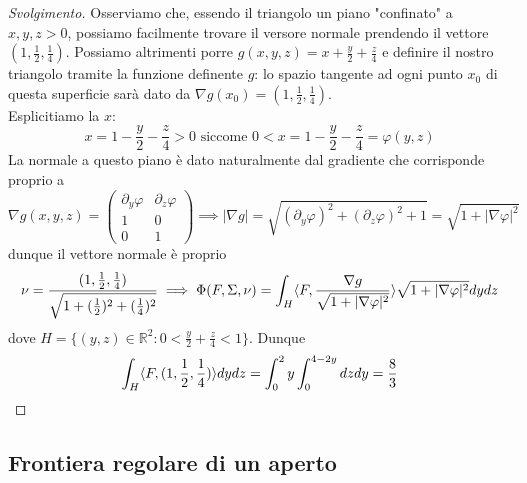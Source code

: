 \begin{proof}[Svolgimento]
	Osserviamo che, essendo il triangolo un piano "confinato" a $x, y, z > 0$, possiamo facilmente trovare il versore normale prendendo il vettore $(1, \frac{1}{2}, \frac{1}{4})$. Possiamo altrimenti porre
	$g(x, y, z) = x + \frac{y}{2} + \frac{z}{4}$ e definire il nostro triangolo tramite la funzione definente $g$: lo spazio tangente ad ogni punto $x_0$ di questa superficie sarà dato da $\nabla g(x_0) = (1, \frac{1}{2},\frac{1}{4})$. \\
	Esplicitiamo la $x$:
	$$
	x = 1 - \frac{y}{2} - \frac{z}{4} > 0 \text{ siccome } 0 < x = 1 - \frac{y}{2} - \frac{z}{4} = \varphi(y, z)
	$$
	La normale a questo piano è dato naturalmente dal gradiente che corrisponde proprio a
	$$
	\nabla g(x, y, z) = \begin{pmatrix} 
		\partial_y \varphi & \partial_z \varphi \\
		1 & 0 \\
		0 & 1
	\end{pmatrix} \implies |\nabla g| = \sqrt{(\partial_y \varphi)^2 + (\partial_z \varphi)^2 + 1} = \sqrt{1 + |\nabla \varphi|^2} 
	$$
	dunque il vettore normale è proprio
	$$
	\nu = \frac{(1, \frac{1}{2}, \frac{1}{4})}{\sqrt{1 + (\frac{1}{2})^2 + (\frac{1}{4})^2}} \implies \Phi(F, \Sigma, \nu) = \int_H \langle F, \frac{\nabla g}{\sqrt{1 + |\nabla \varphi|^2}} \rangle \sqrt{1 + |\nabla \varphi|^2} dydz
	$$
	dove $H = \{(y, z) \in \mathbb{R}^2 : 0 < \frac{y}{2} + \frac{z}{4} < 1 \}$. Dunque
	$$
	\int_H \langle F, (1, \frac{1}{2}, \frac{1}{4}) \rangle dydz =	\int_0^2 y \int_0^{4 - 2y} dzdy = \frac{8}{3}
	$$
\end{proof}

\subsection{Frontiera regolare di un aperto}


